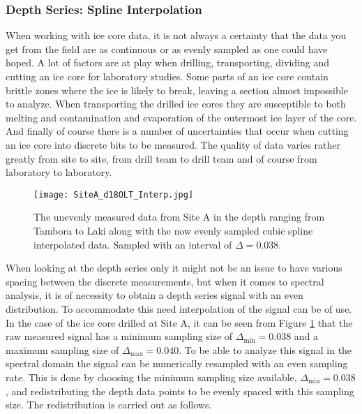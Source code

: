 \documentclass[../../CompleteThesis/Complete_1stDraft.tex]{subfiles}
\begin{document}
\subsubsection[Spline Interpolation]{Depth Series: Spline Interpolation}
When working with ice core data, it is not always a certainty that the data you get from the field are as continuous or as evenly sampled as one could have hoped. A lot of factors are at play when drilling, transporting, dividing and cutting an ice core for laboratory studies. Some parts of an ice core contain brittle zones where the ice is likely to break, leaving a section almost impossible to analyze. When transporting the drilled ice cores they are susceptible to both melting and contamination and evaporation of the outermost ice layer of the core. And finally of course there is a number of uncertainties that occur when cutting an ice core into discrete bits to be measured. The quality of data varies rather greatly from site to site, from drill team to drill team and of course from laboratory to laboratory. \\
\begin{figure}[h]
	\centering
	\texttt{[image: SiteA\_d18OLT\_Interp.jpg]}
	\caption[Measured and interpolated $\delta^{18}$O data, Site A]{The unevenly measured data from Site A in the depth ranging from Tambora to Laki along with the now evenly sampled cubic spline interpolated data. Sampled with an interval of $\Delta = 0.038$.}
	\label{fig:SiteA_d18OLT_Interp}
\end{figure}
When looking at the depth series only it might not be an issue to have various spacing between the discrete measurements, but when it comes to spectral analysis, it is of necessity to obtain a depth series signal with an even distribution. To accommodate this need interpolation of the signal can be of use. In the case of the ice core drilled at Site A, it can be seen from Figure \ref{fig:SiteA_d18OLT_Interp} that the raw measured signal has a minimum sampling size of $\Delta_{\text{min}}=0.038$ and a maximum sampling size of $\Delta_{\text{max}}=0.040$. To be able to analyze this signal in the spectral domain the signal can be numerically resampled with an even sampling rate. This is done by choosing the minimum sampling size available, $\Delta_{\text{min}}=0.038$, and redistributing the depth data points to be evenly spaced with this sampling size. The redistribution is carried out as follows.
\end{document}
